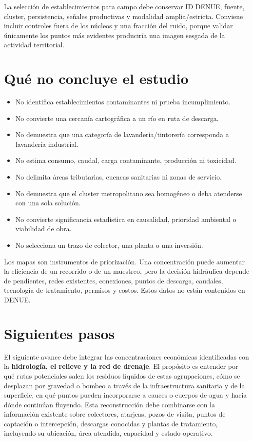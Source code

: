 \documentclass[11pt,letterpaper]{article}
\begin{document}
La selección de establecimientos para campo debe conservar ID DENUE, fuente, cluster, persistencia, señales productivas y modalidad amplia/estricta. Conviene incluir controles fuera de los núcleos y una fracción del ruido, porque validar únicamente los puntos más evidentes produciría una imagen sesgada de la actividad territorial.

\section{Qué no concluye el estudio}

\begin{itemize}
\item No identifica establecimientos contaminantes ni prueba incumplimiento.
\item No convierte una cercanía cartográfica a un río en ruta de descarga.
\item No demuestra que una categoría de lavandería/tintorería corresponda a lavandería industrial.
\item No estima consumo, caudal, carga contaminante, producción ni toxicidad.
\item No delimita áreas tributarias, cuencas sanitarias ni zonas de servicio.
\item No demuestra que el cluster metropolitano sea homogéneo o deba atenderse con una sola solución.
\item No convierte significancia estadística en causalidad, prioridad ambiental o viabilidad de obra.
\item No selecciona un trazo de colector, una planta o una inversión.
\end{itemize}

Los mapas son instrumentos de priorización. Una concentración puede aumentar la eficiencia de un recorrido o de un muestreo, pero la decisión hidráulica depende de pendientes, redes existentes, conexiones, puntos de descarga, caudales, tecnología de tratamiento, permisos y costos. Estos datos no están contenidos en DENUE.

\section{Siguientes pasos}

El siguiente avance debe integrar las concentraciones económicas identificadas con la \textbf{hidrología, el relieve y la red de drenaje}. El propósito es entender por qué rutas potenciales salen los residuos líquidos de estas agrupaciones, cómo se desplazan por gravedad o bombeo a través de la infraestructura sanitaria y de la superficie, en qué puntos pueden incorporarse a cauces o cuerpos de agua y hacia dónde continúan fluyendo. Esta reconstrucción debe combinarse con la información existente sobre colectores, atarjeas, pozos de visita, puntos de captación o intercepción, descargas conocidas y plantas de tratamiento, incluyendo su ubicación, área atendida, capacidad y estado operativo.
\end{document}
